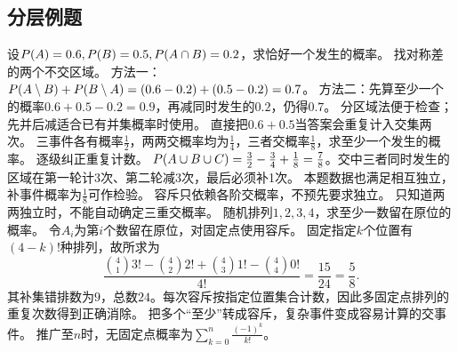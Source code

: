\subsection{分层例题}
{设$P(A)=0.6,P(B)=0.5,P(A\cap B)=0.2$，求恰好一个发生的概率。}
{找对称差的两个不交区域。}
{方法一：$P(A\setminus B)+P(B\setminus A)=(0.6-0.2)+(0.5-0.2)=0.7$。
方法二：先算至少一个的概率$0.6+0.5-0.2=0.9$，再减同时发生的$0.2$，仍得$0.7$。}
{分区域法便于检查；先并后减适合已有并集概率时使用。}
{直接把$0.6+0.5$当答案会重复计入交集两次。}
{三事件各有概率$\frac{1}{2}$，两两交概率均为$\frac{1}{4}$，三者交概率$\frac{1}{8}$，求至少一个发生的概率。}
{逐级纠正重复计数。}
{$P(A\cup B\cup C)=\frac{3}{2}-\frac{3}{4}+\frac{1}{8}=\frac{7}{8}$。交中三者同时发生的区域在第一轮计3次、第二轮减3次，最后必须补1次。
本题数据也满足相互独立，补事件概率为$\frac{1}{8}$可作检验。}
{容斥只依赖各阶交概率，不预先要求独立。}
{只知道两两独立时，不能自动确定三重交概率。}
{随机排列$1,2,3,4$，求至少一数留在原位的概率。}
{令$A_i$为第$i$个数留在原位，对固定点使用容斥。}
{固定指定$k$个位置有$(4-k)!$种排列，故所求为
\[\dfrac{\binom41 3!-\binom42 2!+\binom43 1!-\binom44 0!}{4!}=\dfrac{15}{24}=\dfrac58.\]
其补集错排数为$9$，总数$24$。每次容斥按指定位置集合计数，因此多固定点排列的重复次数得到正确消除。}
{把多个“至少”转成容斥，复杂事件变成容易计算的交事件。}
{推广至$n$时，无固定点概率为$\sum_{k=0}^n\frac{(-1)^k}{k!}$。}

